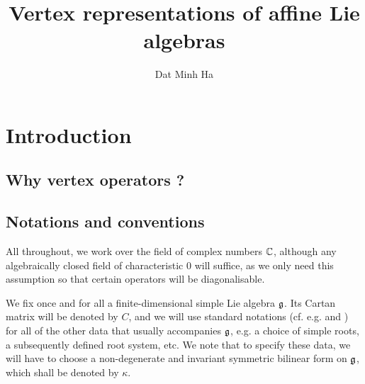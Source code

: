 

\setcounter{section}{-1}


\newcommand{\simpleroots}{\mathbb{I}}



    \title{Vertex representations of affine Lie algebras}
    
    \author{Dat Minh Ha}
    \maketitle
    
    \begin{abstract}
    
    \end{abstract}
    
    {
    \hypersetup{} 
    \tableofcontents %
    }

    \section{Introduction}
        \subsection{Why vertex operators ?}
    
        \subsection{Notations and conventions}
            All throughout, we work over the field of complex numbers $\mathbb{C}$, although any algebraically closed field of characteristic $0$ will suffice, as we only need this assumption so that certain operators will be diagonalisable. 
    
            We fix once and for all a finite-dimensional simple Lie algebra $\mathfrak{g}$. Its Cartan matrix will be denoted by $C$, and we will use standard notations (cf. e.g. \cite{humphreys_lie_algebras} and \cite{kac_infinite_dimensional_lie_algebras}) for all of the other data that usually accompanies $\mathfrak{g}$, e.g. a choice of simple roots, a subsequently defined root system, etc. We note that to specify these data, we will have to choose a non-degenerate and invariant symmetric bilinear form on $\mathfrak{g}$, which shall be denoted by $\kappa$.
    
